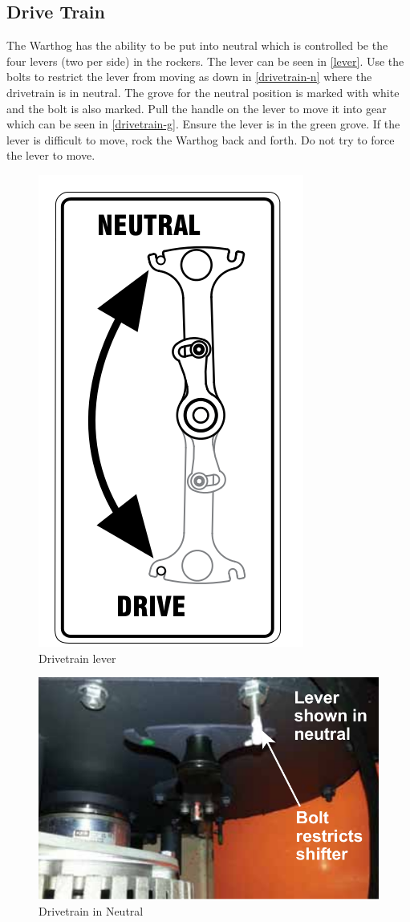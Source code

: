 \documentclass[]{clearpath-latex/clearpath-manual}
\begin{document}
\subsection{Drive Train}

The Warthog has the ability to be put into neutral which is controlled be the four levers (two per side) in the rockers.  The lever can be seen in \autoref{lever}.  Use the bolts to restrict the lever from moving as down in \autoref{drivetrain-n} where the drivetrain is in neutral.  The grove for the neutral position is marked with white and the bolt is also marked.  Pull the handle on the lever to move it into gear which can be seen in \autoref{drivetrain-g}.  Ensure the lever is in the green grove.  If the lever is difficult to move, rock the Warthog back and forth.  Do not try to force the lever to move.

\begin{figure}[!htb]
  \centering
  \includegraphics[width=0.25\linewidth]{graphics/drivetrain.png}
  \caption{Drivetrain lever}
  \label{lever}
\end{figure}


\begin{figure}[!htb]
  \centering
  \includegraphics[width=0.75\linewidth]{graphics/drivetrain-neutral.png}
  \caption{Drivetrain in Neutral}
  \label{drivetrain-n}
\end{figure}
\end{document}
